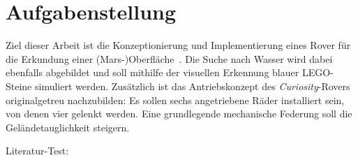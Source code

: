 \section{Aufgabenstellung}
\label{sec:aufgabe}

Ziel dieser Arbeit ist die \glqq Konzeptionierung und Implementierung eines Rover für die Erkundung einer (Mars-)Oberfläche\grqq\ \cite{mueller2019}.
Die Suche nach Wasser wird dabei ebenfalls abgebildet und soll mithilfe der visuellen Erkennung blauer LEGO-Steine simuliert werden.
Zusätzlich ist das Antriebskonzept des \textit{Curiosity}-Rovers originalgetreu nachzubilden: Es sollen sechs angetriebene Räder installiert sein, von denen vier gelenkt werden.
Eine grundlegende mechanische Federung soll die Geländetauglichkeit steigern.

Literatur-Test:
\cite{yamanoor2017}
\cite{horan2013}
\cite{molloy2016}
\cite{donat2018}
\cite{halfacree2019}
\cite{mcmanus2017}
\cite{cox2014}
\cite{pajankar2015}